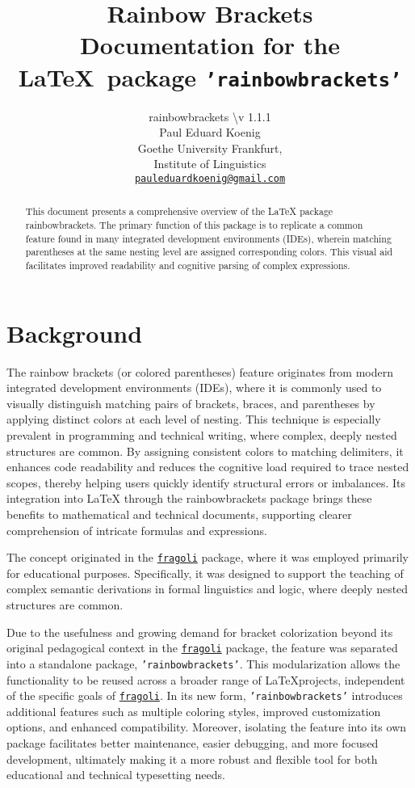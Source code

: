 \documentclass[10pt, a4paper]{article}
\title{Rainbow Brackets\\Documentation for the \LaTeX\ package \texttt{'rainbowbrackets'}}
\author{rainbowbrackets \textbackslash v 1.1.1\\Paul Eduard Koenig\\Goethe University Frankfurt,\\Institute of Linguistics\\\texttt{\href{mailto:pauleduardkoenig@gmail.com}{pauleduardkoenig@gmail.com}}}
\begin{document}
	\maketitle
	\begin{abstract}
		\noindent This document presents a comprehensive overview of the LaTeX package rainbowbrackets. The primary function of this package is to replicate a common feature found in many integrated development environments (IDEs), wherein matching parentheses at the same nesting level are assigned corresponding colors. This visual aid facilitates improved readability and cognitive parsing of complex expressions.
	\end{abstract}
	\tableofcontents
	\section{Background}
	The rainbow brackets (or colored parentheses) feature originates from modern integrated development environments (IDEs), where it is commonly used to visually distinguish matching pairs of brackets, braces, and parentheses by applying distinct colors at each level of nesting. This technique is especially prevalent in programming and technical writing, where complex, deeply nested structures are common. By assigning consistent colors to matching delimiters, it enhances code readability and reduces the cognitive load required to trace nested scopes, thereby helping users quickly identify structural errors or imbalances. Its integration into LaTeX through the rainbowbrackets package brings these benefits to mathematical and technical documents, supporting clearer comprehension of intricate formulas and expressions.
	
	The concept originated in the \texttt{\href{https://ctan.org/pkg/fragoli}{fragoli}} package, where it was employed primarily for educational purposes. Specifically, it was designed to support the teaching of complex semantic derivations in formal linguistics and logic, where deeply nested structures are common. 
	
	Due to the usefulness and growing demand for bracket colorization beyond its original pedagogical context in the \texttt{\href{https://ctan.org/pkg/fragoli}{fragoli}} package, the feature was separated into a standalone package, \texttt{'rainbowbrackets'}. This modularization allows the functionality to be reused across a broader range of \LaTeX projects, independent of the specific goals of \texttt{\href{https://ctan.org/pkg/fragoli}{fragoli}}. In its new form, \texttt{'rainbowbrackets'} introduces additional features such as multiple coloring styles, improved customization options, and enhanced compatibility. Moreover, isolating the feature into its own package facilitates better maintenance, easier debugging, and more focused development, ultimately making it a more robust and flexible tool for both educational and technical typesetting needs.
	
\end{document}
